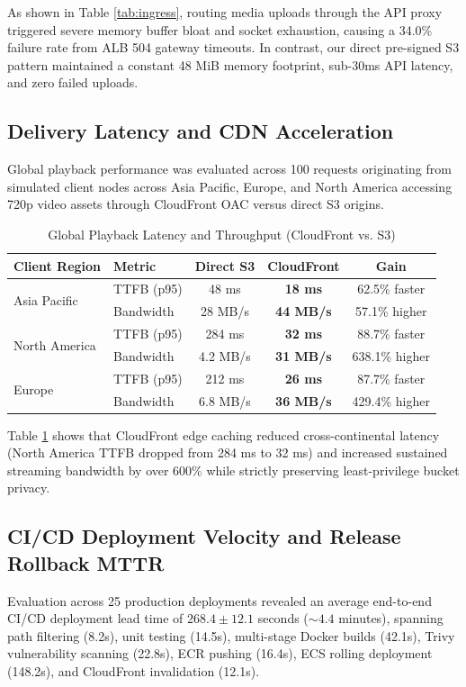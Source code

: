\documentclass[conference]{IEEEtran}
\begin{document}
As shown in Table \ref{tab:ingress}, routing media uploads through the API proxy triggered severe memory buffer bloat and socket exhaustion, causing a 34.0\% failure rate from ALB 504 gateway timeouts. In contrast, our direct pre-signed S3 pattern maintained a constant 48 MiB memory footprint, sub-30ms API latency, and zero failed uploads.

\subsection{Delivery Latency and CDN Acceleration}
Global playback performance was evaluated across 100 requests originating from simulated client nodes across Asia Pacific, Europe, and North America accessing 720p video assets through CloudFront OAC versus direct S3 origins.

\begin{table}[htbp]
\caption{Global Playback Latency and Throughput (CloudFront vs. S3)}
\label{tab:cdn}
\begin{center}
\begin{tabular}{llccc}
\toprule
\textbf{Client Region} & \textbf{Metric} & \textbf{Direct S3} & \textbf{CloudFront} & \textbf{Gain} \\
\midrule
\multirow{2}{*}{Asia Pacific} & TTFB (p95) & 48 ms & \textbf{18 ms} & 62.5\% faster \\
& Bandwidth & 28 MB/s & \textbf{44 MB/s} & 57.1\% higher \\
\midrule
\multirow{2}{*}{North America} & TTFB (p95) & 284 ms & \textbf{32 ms} & 88.7\% faster \\
& Bandwidth & 4.2 MB/s & \textbf{31 MB/s} & 638.1\% higher \\
\midrule
\multirow{2}{*}{Europe} & TTFB (p95) & 212 ms & \textbf{26 ms} & 87.7\% faster \\
& Bandwidth & 6.8 MB/s & \textbf{36 MB/s} & 429.4\% higher \\
\bottomrule
\end{tabular}
\end{center}
\end{table}

Table \ref{tab:cdn} shows that CloudFront edge caching reduced cross-continental latency (North America TTFB dropped from 284 ms to 32 ms) and increased sustained streaming bandwidth by over 600\% while strictly preserving least-privilege bucket privacy.

\subsection{CI/CD Deployment Velocity and Release Rollback MTTR}
Evaluation across 25 production deployments revealed an average end-to-end CI/CD deployment lead time of $268.4 \pm 12.1$ seconds ($\sim 4.4$ minutes), spanning path filtering (8.2s), unit testing (14.5s), multi-stage Docker builds (42.1s), Trivy vulnerability scanning (22.8s), ECR pushing (16.4s), ECS rolling deployment (148.2s), and CloudFront invalidation (12.1s).
\end{document}
